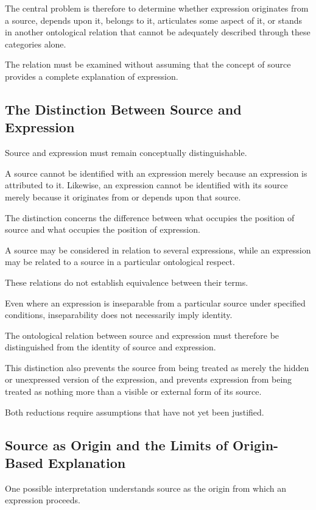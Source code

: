 The central problem is therefore to determine
whether expression originates from a source,
depends upon it, belongs to it, articulates some
aspect of it, or stands in another ontological
relation that cannot be adequately described
through these categories alone.

The relation must be examined without assuming
that the concept of source provides a complete
explanation of expression.

\subsection{The Distinction Between Source and Expression}

Source and expression must remain conceptually
distinguishable.

A source cannot be identified with an expression
merely because an expression is attributed to it.
Likewise, an expression cannot be identified
with its source merely because it originates
from or depends upon that source.

The distinction concerns the difference between
what occupies the position of source and what
occupies the position of expression.

A source may be considered in relation to several
expressions, while an expression may be related
to a source in a particular ontological respect.

These relations do not establish equivalence
between their terms.

Even where an expression is inseparable from
a particular source under specified conditions,
inseparability does not necessarily imply identity.

The ontological relation between source and
expression must therefore be distinguished
from the identity of source and expression.

This distinction also prevents the source from
being treated as merely the hidden or unexpressed
version of the expression, and prevents expression
from being treated as nothing more than a visible
or external form of its source.

Both reductions require assumptions that have
not yet been justified.

\subsection{Source as Origin and the Limits of Origin-Based Explanation}

One possible interpretation understands source
as the origin from which an expression proceeds.

